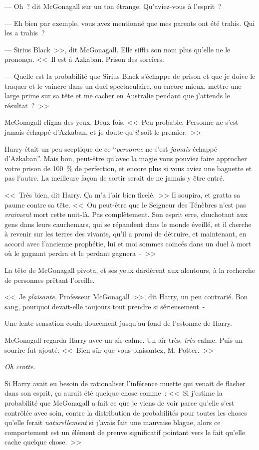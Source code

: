--- Oh~? dit McGonagall sur un ton étrange. Qu'aviez-vous à l'esprit~?

--- Eh bien par exemple, vous avez mentionné que mes parents ont été trahis. Qui les a trahis~?

--- Sirius Black~>>, dit McGonagall. Elle siffla son nom plus qu'elle ne le prononça. <<~Il est à Azkaban. Prison des sorciers.

--- Quelle est la probabilité que Sirius Black s'échappe de prison et que je doive le traquer et le vaincre dans un duel spectaculaire, ou encore mieux, mettre une large prime sur sa tête et me cacher en Australie pendant que j'attends le résultat~?~>>

McGonagall cligna des yeux. Deux fois. <<~Peu probable. Personne ne s'est jamais échappé d'Azkaban, et je doute qu'\emph{il} soit le premier.~>>

Harry était un peu sceptique de ce “\emph{personne} ne s'est \emph{jamais} échappé d'Azkaban”. Mais bon, peut-être qu'avec la magie vous pouviez faire approcher votre prison de 100~\% de perfection, et encore plus si vous aviez une baguette et pas l'autre. La meilleure façon de sortir serait de ne jamais y être entré.

<<~Très bien, dit Harry. Ça m'a l'air bien ficelé.~>> Il soupira, et gratta sa paume contre sa tête. <<~Ou peut-être que le Seigneur des Ténèbres n'est pas \emph{vraiment} mort cette nuit-là. Pas complètement. Son esprit erre, chuchotant aux gens dans leurs cauchemars, qui se répandent dans le monde éveillé, et il cherche à revenir sur les terres des vivants, qu'il a promi de détruire, et maintenant, en accord avec l'ancienne prophétie, lui et moi sommes coincés dans un duel à mort où le gagnant perdra et le perdant gagnera~-~>>

La tête de McGonagall pivota, et ses yeux dardèrent aux alentours, à la recherche de personnes prêtant l'oreille.

<<~Je \emph{plaisante}, Professeur McGonagall~>>, dit Harry, un peu contrarié. Bon sang, pourquoi devait-elle toujours tout prendre si sérieusement~-

Une lente sensation coula doucement jusqu'au fond de l'estomac de Harry.

McGonagall regarda Harry avec un air calme. Un air très, \emph{très} calme. Puis un sourire fut ajouté. <<~Bien sûr que vous plaisantez, M. Potter.~>>

\emph{Oh crotte.}

Si Harry avait eu besoin de rationaliser l'inférence muette qui venait de flasher dans son esprit, ça aurait été quelque chose comme~: <<~Si j'estime la probabilité que McGonagall a fait ce que je viens de voir parce qu'elle s'est contrôlée avec soin, contre la distribution de probabilités pour toutes les choses qu'elle ferait \emph{naturellement} si j'avais fait une mauvaise blague, alors ce comportement est un élément de preuve significatif pointant vers le fait qu'elle cache quelque chose.~>>

